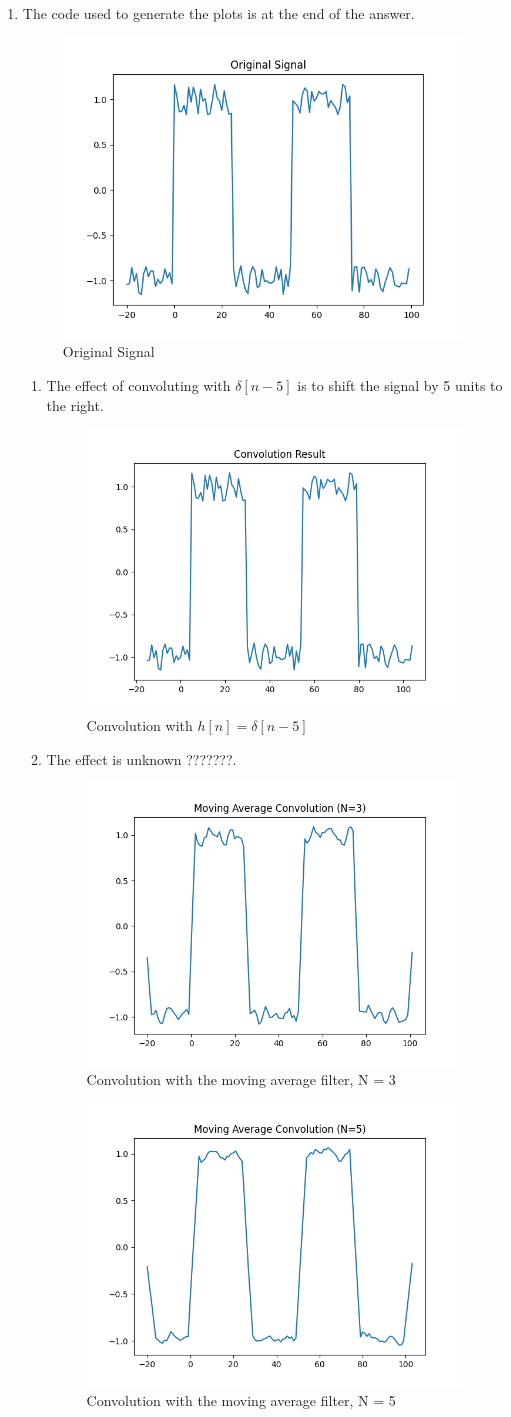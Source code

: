\documentclass[10pt,a4paper, margin=1in]{article}
\begin{document}
\begin{enumerate}
\item The code used to generate the plots is at the end of the answer.

\begin{figure}[H]    
    \centering
    \caption{Original Signal}
    \includegraphics[width=0.4\linewidth]{images/original.png}
\end{figure}
\begin{enumerate}
    \item The effect of convoluting with $\delta[n-5]$ is to shift the signal by 5 units to the right.
\begin{figure}[H]
    \centering
    \caption{Convolution with $h[n] = \delta[n-5]$}
    \includegraphics[width=0.4\linewidth]{images/convolution.png}
\end{figure}
    \item The effect is unknown ???????.
\begin{figure}[H]
    \centering
    \caption{Convolution with the moving average filter, N = 3}
    \includegraphics[width=0.4\linewidth]{images/moving_average_3.png}
\end{figure}
\begin{figure}[H]
    \centering
    \caption{Convolution with the moving average filter, N = 5}
    \includegraphics[width=0.4\linewidth]{images/moving_average_5.png}

\end{figure}
\end{enumerate}
\end{enumerate}
\end{document}
